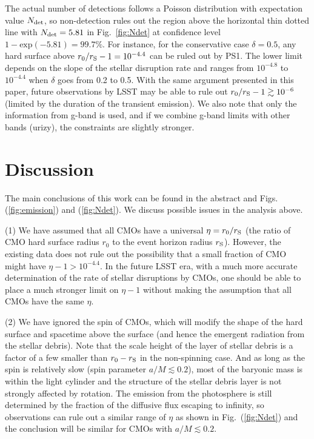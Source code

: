 \documentclass[useAMS,usenatbib]{mn2e}
\begin{document}
The actual number of detections follows a Poisson distribution with
expectation value $N_{\rm det}$, so non-detection rules out the region
above the horizontal thin dotted line with $N_{\rm det} = 5.81$ in
Fig.~\ref{fig:Ndet} at confidence level $1-\mathrm{exp}(-5.81)
= 99.7\%$. For instance, for the conservative case $\delta=0.5$, any
hard surface above $r_0/r_{\rm S} - 1 = 10^{-4.4}$ can be ruled out by
PS1. The lower limit depends on the slope of the stellar disruption rate
and ranges from $10^{-4.8}$ to $10^{-4.4}$ when $\delta$
goes from 0.2 to 0.5. With the same argument presented in this paper,
future observations by LSST may be able to rule out
$r_0/r_{\rm S}-1 \gtrsim 10^{-6}$ (limited by the duration of
the transient emission). We also note that only the
information from g-band is used, and if we combine g-band limits with
other bands (urizy), the constraints are slightly stronger.

\section{Discussion}\label{sec:discussion}

The main conclusions of this work can be found in the abstract and Figs.
(\ref{fig:emission}) and (\ref{fig:Ndet}). We
discuss possible issues in the analysis above. 

(1) We have assumed that all CMOs have a universal $\eta
= r_0/r_{\rm S}$ (the ratio of CMO hard surface radius
$r_0$ to the event horizon radius $r_{\rm S}$). However, the existing
data does not rule out the 
possibility that a small fraction of CMO might have
$\eta-1>10^{-4.4}$. In the future LSST era, with a much more accurate 
determination of the rate of stellar disruptions by CMOs, one should
be able to place a much stronger limit on $\eta-1$ without making the
assumption that all CMOs have the same $\eta$.

(2) We have ignored the spin of CMOs, which will modify the shape of the
hard surface and spacetime above the surface (and hence the emergent
radiation from the stellar debris). Note that the scale 
height of the layer of stellar debris is a factor of a few smaller
than $r_0-r_{\rm S}$ in the non-spinning case. And as long as the spin
is relatively slow (spin parameter $a/M\lesssim0.2$), most of the
baryonic mass is within the light 
cylinder and the structure of the stellar debris layer is not strongly
affected by rotation. The emission from the photosphere is still
determined by the fraction of the diffusive flux escaping to infinity, so
observations can rule out a similar range of 
$\eta$ as shown in Fig.~(\ref{fig:Ndet}) and the conclusion will be
similar for CMOs with $a/M \lesssim0.2$. 
\end{document}
